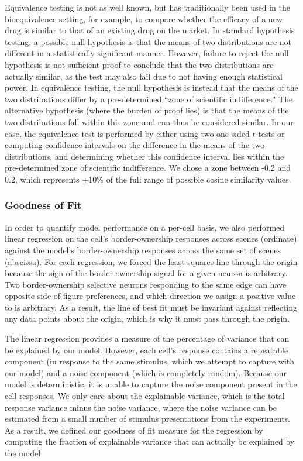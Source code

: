 Equivalence testing is not as well known, but has traditionally been used in the bioequivalence setting, for example, to compare whether the efficacy of a new drug is similar to that of an existing drug on the market. In standard hypothesis testing, a possible null hypothesis is that the means of two distributions are not different in a statistically significant manner. However, failure to reject the null hypothesis is not sufficient proof to conclude that the two distributions are actually similar, as the test may also fail due to not having enough statistical power. In equivalence testing, the null hypothesis is instead that the means of the two distributions differ by a pre-determined ``zone of scientific indifference." The alternative hypothesis (where the burden of proof lies) is that the means of the two distributions fall within this zone and can thus be considered similar. In our case, the equivalence test is performed by either using two one-sided $t$-tests or computing confidence intervals on the difference in the means of the two distributions, and determining whether this confidence interval lies within the pre-determined zone of scientific indifference. We chose a zone between -0.2 and 0.2, which represents $\pm$10\% of the full range of possible cosine similarity values.

\subsubsection{Goodness of Fit}
In order to quantify model performance on a per-cell basis, we also performed linear regression on the cell's border-ownership responses across scenes (ordinate) against the model's border-ownership responses across the same set of scenes (abscissa). For each regression, we forced the least-squares line through the origin because the sign of the border-ownership signal for a given neuron is arbitrary. Two border-ownership selective neurons responding to the same edge can have opposite side-of-figure preferences, and which direction we assign a positive value to is arbitrary. As a result, the line of best fit must be invariant against reflecting any data points about the origin, which is why it must pass through the origin.

The linear regression provides a measure of the percentage of variance that can be explained by our model. However, each cell's response contains a repeatable component (in response to the same stimulus, which we attempt to capture with our model) and a noise component (which is completely random). Because our model is deterministic, it is unable to capture the noise component present in the cell responses.  We only care about the explainable variance, which is the total response variance minus the noise variance, where the noise variance can be estimated from a small number of stimulus presentations from the experiments. As a result, we defined our goodness of fit measure for the regression by computing the fraction of explainable variance that can actually be explained by the model

